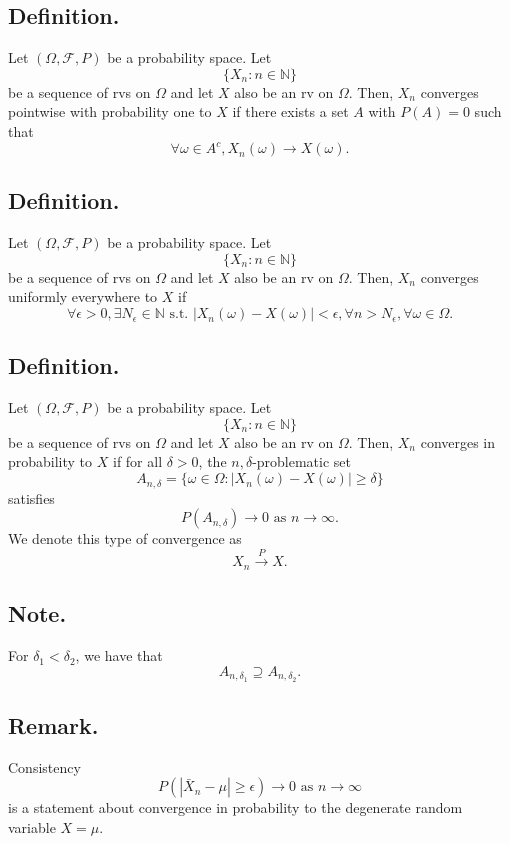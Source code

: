 \documentclass[titlepage]{article}
\begin{document}
\subsection{Definition.} Let $(\Omega, \mathcal{F}, P)$ be a probability space. Let 
$$\{X_{n}: n \in \mathbb{N}\}$$
be a sequence of rvs on $\Omega$ and let $X$ also be an rv on $\Omega$. Then, $X_{n}$ converges pointwise with probability one to $X$ if there exists a set $A$ with $P(A) = 0$ such that 
$$\forall \omega \in A^{c}, X_{n}(\omega) \to X(\omega).$$

\subsection{Definition.} Let $(\Omega, \mathcal{F}, P)$ be a probability space. Let
$$\{X_{n}: n \in \mathbb{N}\}$$
be a sequence of rvs on $\Omega$ and let $X$ also be an rv on $\Omega$. Then, $X_{n}$ converges uniformly everywhere to $X$ if 
$$\forall \epsilon > 0, \exists N_{\epsilon} \in \mathbb{N} \text{ s.t. } |X_{n}(\omega) - X(\omega)| < \epsilon, \forall n > N_{\epsilon}, \forall \omega \in \Omega.$$ 

\subsection{Definition.} Let $(\Omega, \mathcal{F}, P)$ be a probability space. Let
$$\{X_{n}: n \in \mathbb{N}\}$$
be a sequence of rvs on $\Omega$ and let $X$ also be an rv on $\Omega$. Then, $X_{n}$ converges in probability to $X$ if for all $\delta > 0$, the $n,\delta$-problematic set 
$$A_{n,\delta} = \{\omega \in \Omega: |X_{n}(\omega) - X(\omega)| \geq \delta\}$$
satisfies 
$$P(A_{n,\delta}) \to 0 \text{ as } n \to \infty.$$
We denote this type of convergence as 
$$X_{n} \xrightarrow{P} X.$$

\subsection{Note.} For $\delta_{1} < \delta_{2}$, we have that 
$$A_{n,\delta_{1}} \supseteq A_{n,\delta_{2}}.$$

\subsection{Remark.} Consistency 
$$P\left(|\bar{X}_{n} - \mu| \geq \epsilon\right) \to 0 \text{ as } n \to \infty$$
is a statement about convergence in probability to the degenerate random variable $X = \mu$.
\end{document}
